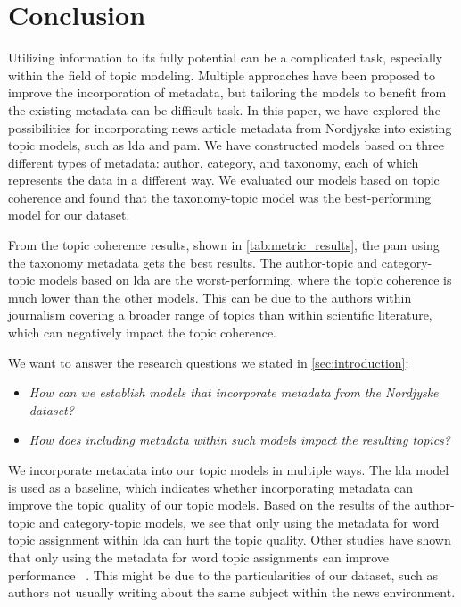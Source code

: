 \section{Conclusion}\label{sec:conclusion}
Utilizing information to its fully potential can be a complicated task, especially within the field of topic modeling. 
Multiple approaches have been proposed to improve the incorporation of metadata, but tailoring the models to benefit from the existing metadata can be difficult task.
In this paper, we have explored the possibilities for incorporating news article metadata from Nordjyske into existing topic models, such as \gls{lda} and \gls{pam}.
We have constructed models based on three different types of metadata: author, category, and taxonomy, each of which represents the data in a different way.
We evaluated our models based on topic coherence and found that the taxonomy-topic model was the best-performing model for our dataset.

From the topic coherence results, shown in \autoref{tab:metric_results}, the \acrfull{pam} using the taxonomy metadata gets the best results.
The author-topic and category-topic models based on \gls{lda} are the worst-performing, where the topic coherence is much lower than the other models. 
This can be due to the authors within journalism covering a broader range of topics than within scientific literature, which can negatively impact the topic coherence.

We want to answer the research questions we stated in \autoref{sec:introduction}:
\begin{itemize}	
    \item \textit{How can we establish models that incorporate metadata from the Nordjyske dataset?}
    \item \textit{How does including metadata within such models impact the resulting topics?}
 \end{itemize}

We incorporate metadata into our topic models in multiple ways.
The \gls{lda} model is used as a baseline, which indicates whether incorporating metadata can improve the topic quality of our topic models.
Based on the results of the author-topic and category-topic models, we see that only using the metadata for word topic assignment within \gls{lda} can hurt the topic quality.
Other studies have shown that only using the metadata for word topic assignments can improve performance~\cite{MetaLDA2017} \cite{author_topic_2012}.
This might be due to the particularities of our dataset, such as authors not usually writing about the same subject within the news environment.

